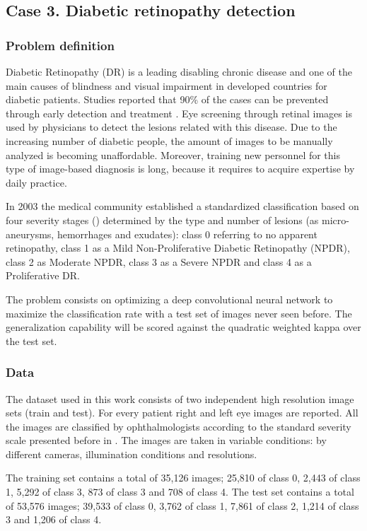 \documentclass[times,twocolumn,final,authoryear]{elsarticle}
\begin{document}
\subsection{Case 3. Diabetic retinopathy detection}
\subsubsection{Problem definition}

Diabetic Retinopathy (DR) is a leading disabling chronic disease  and  one of the main causes of blindness and visual impairment in developed countries for diabetic patients. Studies reported that 90\% of the cases can be prevented through early detection and treatment \citep{romero2006nonproliferative}. Eye screening through retinal images is used by physicians to detect the lesions related with this disease. Due to the increasing number of diabetic people, the amount of images to be manually analyzed is becoming unaffordable. Moreover, training new personnel for this type of image-based diagnosis is long, because it requires to acquire expertise by daily practice. 

In 2003 the medical community established a standardized classification based on four severity stages (\cite{diaclass}) determined by the type and number of lesions (as micro-aneurysms, hemorrhages and exudates): class 0 referring to no apparent retinopathy, class 1 as a Mild Non-Proliferative Diabetic Retinopathy (NPDR), class 2 as Moderate NPDR, class 3 as a Severe NPDR and class 4 as a Proliferative DR. 

The problem consists on optimizing a deep convolutional neural network to maximize the classification rate with a test set of images never seen before. The generalization capability will be scored against the quadratic weighted kappa over the test set.

\subsubsection{Data}

The dataset used in this work consists of two independent high resolution image sets (train and test). For every patient right and left eye images are reported. All the images are classified by ophthalmologists according to the standard severity scale presented before in \cite{diaclass}. The images are taken in variable conditions: by different cameras, illumination conditions and resolutions. 

The training set contains a total of 35,126 images; 25,810 of class 0, 2,443 of class 1, 5,292 of class 3, 873 of class 3 and 708 of class 4. The test set contains a total of 53,576 images; 39,533 of class 0, 3,762 of class 1, 7,861 of class 2, 1,214 of class 3 and 1,206 of class 4. 
\end{document}
